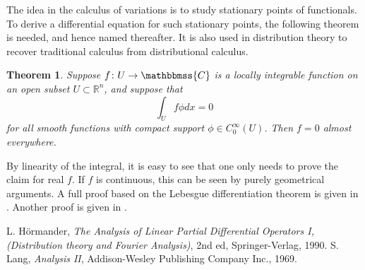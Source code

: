 \documentclass[12pt]{article}
\newcommand{\sR}[0]{\mathbb{R}}
\newcommand{\C}{\mathbbmss{C}}
\newtheorem{thm}{Theorem}
\begin{document}
The idea in the calculus of variations is to study 
stationary points of functionals. 
To derive a differential equation for such stationary
points, the following theorem is needed, and hence
named thereafter. It is also used in distribution theory
to recover traditional calculus from distributional calculus. 

\begin{thm}
Suppose $f\colon U\to \C$ is a locally integrable function on an
open subset $U\subset \sR^n$,
and suppose that
$$ 
  \int_{U} f \phi dx =0
$$
for all smooth functions with compact support $\phi\in C_0^\infty(U)$.
Then $f=0$ almost everywhere.
\end{thm}

By linearity of the integral, it is easy to see that one only needs to
prove the claim for real $f$. If $f$ is continuous, this can be seen 
by purely geometrical arguments. A full proof
based on the Lebesgue differentiation theorem is given
in \cite{hormander}. Another proof is given in \cite{lang}.

\begin{thebibliography}{9}
L. H\"ormander, \emph{The Analysis of Linear Partial Differential Operators I,
(Distribution theory and Fourier Analysis)}, 2nd ed, Springer-Verlag, 1990.
S. Lang, \emph{Analysis II},
Addison-Wesley Publishing Company Inc., 1969.
\end{thebibliography}
\end{document}
